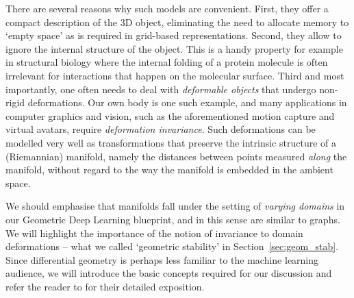 There are several reasons why such models are convenient. First, they offer a compact description of the 3D object, eliminating the need to allocate memory to `empty space' as is required in grid-based representations. 
%
Second, they allow to ignore the internal structure of the object. This is a handy property for example in structural biology where the internal folding of a protein molecule is often irrelevant for interactions that happen on the molecular surface. 
%
Third and most importantly, one often needs to deal with {\em deformable objects} that undergo non-rigid deformations. Our own body is one such example, and many applications in computer graphics and vision, such as the aforementioned motion capture and virtual avatars, require {\em deformation invariance}.
Such deformations can be modelled very well as transformations that preserve the intrinsic structure of a (Riemannian) manifold, namely the distances between points measured \emph{along} the manifold, without regard to the way the manifold is embedded in the ambient space.

We should emphasise that %
manifolds fall under the setting of {\em varying domains} in our Geometric Deep Learning blueprint, and in this sense are similar to graphs. We will highlight the importance of the notion of invariance to domain deformations -- what we called `geometric stability' in Section~\ref{sec:geom_stab}. 
%
Since differential geometry is perhaps less familiar to the machine learning audience, we will introduce the basic concepts required for our discussion and refer the reader to \cite{penrose2005road} for their detailed exposition.  

